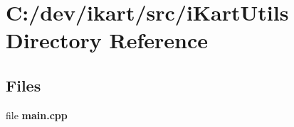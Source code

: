 \section{C\+:/dev/ikart/src/i\+Kart\+Utils Directory Reference}
\label{dir_66f460a5efc4ddf8c9c7da9b3e3e46fc}
\subsection*{Files}
\begin{DoxyCompactItemize}
\item 
file {\bfseries main.\+cpp}
\end{DoxyCompactItemize}
